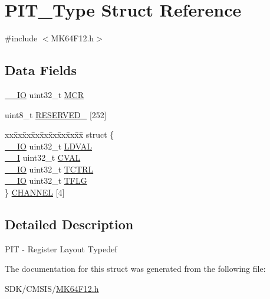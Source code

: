 \hypertarget{struct_p_i_t___type}{}\section{P\+I\+T\+\_\+\+Type Struct Reference}
\label{struct_p_i_t___type}


{\ttfamily \#include $<$M\+K64\+F12.\+h$>$}

\subsection*{Data Fields}
\begin{DoxyCompactItemize}
\item 
\mbox{\hyperlink{core__cm4_8h_aec43007d9998a0a0e01faede4133d6be}{\+\_\+\+\_\+\+IO}} uint32\+\_\+t \mbox{\hyperlink{group___v_r_e_f___peripheral___access___layer_ga27af4e9f888f0b7b1e8da7e002d98798}{M\+CR}}
\item 
uint8\+\_\+t \mbox{\hyperlink{group___v_r_e_f___peripheral___access___layer_ga8a05a5b3da78aef59223205ee54c22b5}{R\+E\+S\+E\+R\+V\+E\+D\+\_}} \mbox{[}252\mbox{]}
\item 
\begin{tabbing}
xx\=xx\=xx\=xx\=xx\=xx\=xx\=xx\=xx\=\kill
struct \{\\
\>\mbox{\hyperlink{core__cm4_8h_aec43007d9998a0a0e01faede4133d6be}{\_\_IO}} uint32\_t \mbox{\hyperlink{group___v_r_e_f___peripheral___access___layer_ga7066d020800ce5572217b4dd7be33245}{LDVAL}}\\
\>\mbox{\hyperlink{core__cm4_8h_af63697ed9952cc71e1225efe205f6cd3}{\_\_I}} uint32\_t \mbox{\hyperlink{group___v_r_e_f___peripheral___access___layer_gad4fcb6f0bd4cbbc890593eeb21152a92}{CVAL}}\\
\>\mbox{\hyperlink{core__cm4_8h_aec43007d9998a0a0e01faede4133d6be}{\_\_IO}} uint32\_t \mbox{\hyperlink{group___v_r_e_f___peripheral___access___layer_gad205d7250cea8af8b177be3e861193d8}{TCTRL}}\\
\>\mbox{\hyperlink{core__cm4_8h_aec43007d9998a0a0e01faede4133d6be}{\_\_IO}} uint32\_t \mbox{\hyperlink{group___v_r_e_f___peripheral___access___layer_ga38fdb1e5ac5dd95a6f67e651ded71276}{TFLG}}\\
\} \mbox{\hyperlink{group___v_r_e_f___peripheral___access___layer_gab04f5654f5af63fa2e971faccfc67617}{CHANNEL}} \mbox{[}4\mbox{]}\\

\end{tabbing}\end{DoxyCompactItemize}


\subsection{Detailed Description}
P\+IT -\/ Register Layout Typedef 

The documentation for this struct was generated from the following file\+:\begin{DoxyCompactItemize}
\item 
S\+D\+K/\+C\+M\+S\+I\+S/\mbox{\hyperlink{_m_k64_f12_8h}{M\+K64\+F12.\+h}}\end{DoxyCompactItemize}
